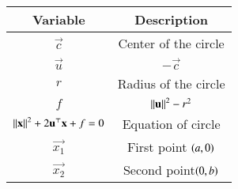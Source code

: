 \begin{tabular}[12pt]{ |c| c|}
    \hline
    \textbf{Variable} & \textbf{Description}\\
    \hline
    $ \vec{c} $ & Center of the circle\\
    \hline
    $ \vec{u} $ & $-\vec{c}$ \\
    \hline
    $ r $ & Radius of the circle\\
    \hline 
    $ f $ & $ \left\lVert\mathbf{u}\right\rVert^{2}-r^{2} $\\
    \hline
    $ \left\lVert\mathbf{x}\right\rVert^{2}+2\mathbf{u}^\top\mathbf{x}+f=0$ & Equation of circle \\
    \hline
    $ \vec{x_{1}}$ & First point $\left(a,0\right)$ \\
    \hline
    $ \vec{x_{2}} $ & Second point$\left(0,b\right)$ \\
    \hline   
    \end{tabular}
